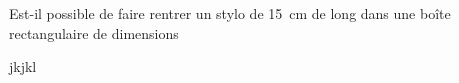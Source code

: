 
\begin{exercice}\label{exo2smath-0018}

    Est-il possible de faire rentrer un stylo de \SI{15}{\centi\meter} de long dans une boîte rectangulaire de dimensions 

    jkjkl

\end{exercice}
